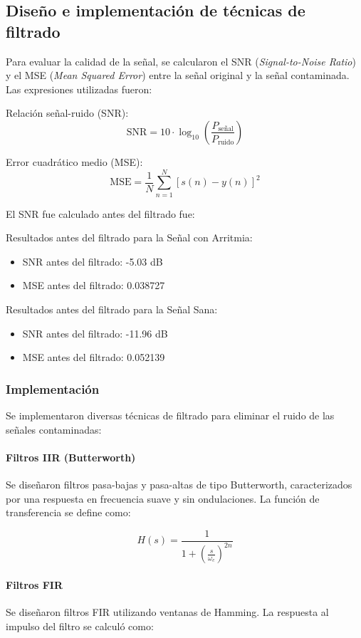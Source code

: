 \documentclass[10pt, conference]{IEEEtran}
\begin{document}
\subsection{Diseño e implementación de técnicas de filtrado}

Para evaluar la calidad de la señal, se calcularon el SNR (\textit{Signal-to-Noise Ratio}) y el MSE (\textit{Mean Squared Error}) entre la señal original y la señal contaminada. Las expresiones utilizadas fueron:

Relación señal-ruido (SNR):
    \[
    \text{SNR} = 10 \cdot \log_{10}\left(\frac{P_{\text{señal}}}{P_{\text{ruido}}}\right)
    \]

Error cuadrático medio (MSE):
    \[
    \text{MSE} = \frac{1}{N} \sum_{n=1}^N \left[s(n) - y(n)\right]^2
    \]

El SNR fue calculado antes del filtrado fue:

Resultados antes del filtrado para la Señal con Arritmia:
	\begin{itemize}
		\item SNR antes del filtrado: -5.03 dB
		\item MSE antes del filtrado: 0.038727
	\end{itemize}

Resultados antes del filtrado para la Señal Sana:
	\begin{itemize}
		\item SNR antes del filtrado: -11.96 dB
		\item MSE antes del filtrado: 0.052139
	\end{itemize}

\subsubsection{Implementación}
Se implementaron diversas técnicas de filtrado para eliminar el ruido de las señales contaminadas:

\paragraph{Filtros IIR (Butterworth)}
Se diseñaron filtros pasa-bajas y pasa-altas de tipo Butterworth, caracterizados por una respuesta en frecuencia suave y sin ondulaciones. La función de transferencia se define como:

\[
H(s) = \frac{1}{1 + \left(\frac{s}{\omega_c}\right)^{2n}}
\]

\paragraph{Filtros FIR}
Se diseñaron filtros FIR utilizando ventanas de Hamming. La respuesta al impulso del filtro se calculó como:
\end{document}
